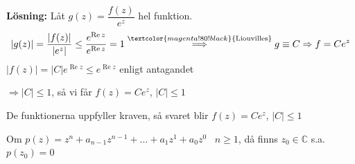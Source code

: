 \textbf{Lösning:} Låt $g(z) = \dfrac{f(z)}{e^z}$ hel funktion.
\[ |g(z)| = \frac{|f(z)|}{|e^z|} \le \frac{e^{\operatorname{Re} z}}{e^{\operatorname{Re} z}} = 1 \overset{\textcolor{magenta!80!black}{\text{Liouvilles}}}{\Longrightarrow} g \equiv C \Rightarrow f = Ce^z \]
$|f(z)| = |C|e^{\operatorname{Re} z} \le e^{\operatorname{Re} z}$ enligt antagandet

$\Rightarrow |C| \le 1$, så vi får $f(z) = Ce^z$, $|C| \le 1$

De funktionerna uppfyller kraven, så svaret blir $f(z) = Ce^z$, $|C| \le 1$

\begin{theorem}
Om $p(z) = z^n + a_{n-1}z^{n-1} + \dots + a_1 z^1 + a_0 z^0$ \ $n \ge 1$, då finns $z_0 \in \mathbb{C}$ s.a.\ $p(z_0) = 0$
\end{theorem}
